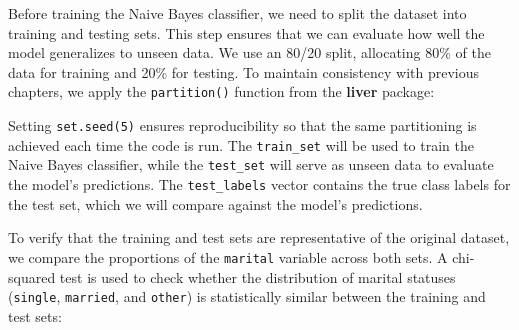 \documentclass[
  11pt,
]{book}
\makeatletter
\newenvironment{Shaded}{}{}
\newcommand{\AttributeTok}[1]{#1}
\newcommand{\DecValTok}[1]{#1}
\newcommand{\FloatTok}[1]{#1}
\newcommand{\FunctionTok}[1]{#1}
\newcommand{\NormalTok}[1]{#1}
\newcommand{\OtherTok}[1]{\textcolor[rgb]{0.39,0.39,0.39}{#1}}
\newcommand{\SpecialCharTok}[1]{\textcolor[rgb]{0.39,0.39,0.39}{#1}}
\newcommand{\StringTok}[1]{\textcolor[rgb]{0.39,0.39,0.39}{#1}}
\newenvironment{kframe}{%
\medskip{}
\setlength{\fboxsep}{.8em}
 \def\at@end@of@kframe{}%
 \ifinner\ifhmode%
  \def\at@end@of@kframe{\end{minipage}}%
  \begin{minipage}{\columnwidth}%
 \fi\fi%
 \def\FrameCommand##1{\hskip\@totalleftmargin \hskip-\fboxsep
 \colorbox{shadecolor}{##1}\hskip-\fboxsep
     \hskip-\linewidth \hskip-\@totalleftmargin \hskip\columnwidth}%
 \MakeFramed {\advance\hsize-\width
   \@totalleftmargin\z@ \linewidth\hsize
   \@setminipage}}%
 {\par\unskip\endMakeFramed%
 \at@end@of@kframe}
\renewenvironment{Shaded}{\begin{kframe}}{\end{kframe}}
\theoremstyle{definition}
\theoremstyle{definition}
\theoremstyle{definition}
\theoremstyle{definition}
\theoremstyle{remark}
\makeatother
\begin{document}
Before training the Naive Bayes classifier, we need to split the dataset into training and testing sets. This step ensures that we can evaluate how well the model generalizes to unseen data. We use an 80/20 split, allocating 80\% of the data for training and 20\% for testing. To maintain consistency with previous chapters, we apply the \texttt{partition()} function from the \textbf{liver} package:

\begin{Shaded}
\end{Shaded}

Setting \texttt{set.seed(5)} ensures reproducibility so that the same partitioning is achieved each time the code is run. The \texttt{train\_set} will be used to train the Naive Bayes classifier, while the \texttt{test\_set} will serve as unseen data to evaluate the model's predictions. The \texttt{test\_labels} vector contains the true class labels for the test set, which we will compare against the model's predictions.

To verify that the training and test sets are representative of the original dataset, we compare the proportions of the \texttt{marital} variable across both sets. A chi-squared test is used to check whether the distribution of marital statuses (\texttt{single}, \texttt{married}, and \texttt{other}) is statistically similar between the training and test sets:

\begin{Shaded}
\end{Shaded}
\end{document}
